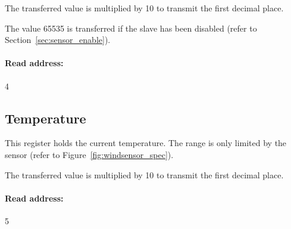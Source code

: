 The transferred value is multiplied by 10 to transmit the first decimal place.

The value 65535 is transferred if the slave has been disabled (refer to Section~\ref{sec:sensor_enable}).

\paragraph{Read address:} 4

\subsection{Temperature}
This register holds the current temperature. The range is only limited by the sensor (refer to Figure~\ref{fig:windsensor_spec}).

The transferred value is multiplied by 10 to transmit the first decimal place.

\paragraph{Read address:} 5
